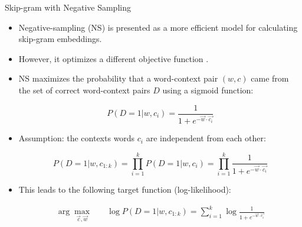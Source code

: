 \documentclass[handout]{beamer}
\begin{document}

\begin{frame}{Skip-gram with Negative Sampling}
\begin{scriptsize}
\begin{itemize}

\item Negative-sampling (NS) is presented as a more efficient model for calculating skip-gram embeddings. 
\item However, it optimizes a different objective function \cite{goldberg2014word2vec}.


\item NS maximizes the probability that a word-context pair $(w, c)$ came from the set of correct word-context pairs $D$ using a sigmoid function:

\begin{displaymath}
P(D = 1| w,c_i) = \frac{1}{1+e^{-\vec{w} \cdot \vec{c_{i}}}}
\end{displaymath}

\item Assumption: the contexts words $c_i$ are independent from each other:

\begin{displaymath}
P(D = 1| w,c_{1:k}) = \prod_{i=1}^{k}{P(D = 1| w,c_i)} = \prod_{i=1}^{k}{\frac{1}{1+e^{-\vec{w} \cdot \vec{c_{i}}}}} 
\end{displaymath}

\item This leads to the following target function (log-likelihood): 

\begin{equation}
\begin{split}
\operatorname{arg} \max_{\vec{c}, \vec{w}} & \quad \log P(D = 1| w,c_{1:k}) = \sum_{i=1}^{k}{\log \frac{1}{1+e^{-\vec{w} \cdot \vec{c_{i}}}}}
\end{split}
\end{equation}





\end{itemize}
\end{scriptsize}
\end{frame}
\end{document}
